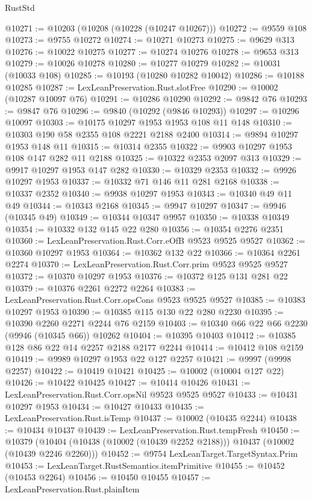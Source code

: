\begin{lexlean}{RustStd}
\begin{coremodule}
@10271 := @10203 (@10208 (@10228 (@10247 @10267)))
@10272 := @9559 @108
@10273 := @9755 @10272
@10274 := @10271 @10273
@10275 := @9629 @313
@10276 := @10022 @10275
@10277 := @10274 @10276
@10278 := @9653 @313
@10279 := @10026 @10278
@10280 := @10277 @10279
@10282 := @10031 (@10033 @108)
@10285 := @10193 (@10280 @10282 @10042)
@10286 := @10188 @10285
@10287 := LexLeanPreservation.Rust.slotFree
@10290 := @10002 (@10287 @10097 @76)
@10291 := @10286 @10290
@10292 := @9842 @76
@10293 := @9847 @76
@10296 := @9840 (@10292 (@9846 @10293))
@10297 := @10296 @10097
@10303 := @10175 @10297 @1953 @1953 @108 @11 @148
@10310 := @10303 @190 @58 @2355 @108 @2221 @2188 @2400
@10314 := @9894 @10297 @1953 @148 @11
@10315 := @10314 @2355
@10322 := @9903 @10297 @1953 @108 @147 @282 @11 @2188
@10325 := @10322 @2353 @2097 @313
@10329 := @9917 @10297 @1953 @147 @282
@10330 := @10329 @2353
@10332 := @9926 @10297 @1953
@10337 := @10332 @71 @146 @11 @281 @2168
@10338 := @10337 @2352
@10340 := @9938 @10297 @1953
@10343 := @10340 @49 @11 @49
@10344 := @10343 @2168
@10345 := @9947 @10297
@10347 := @9946 (@10345 @49)
@10349 := @10344 @10347 @9957
@10350 := @10338 @10349
@10354 := @10332 @132 @145 @22 @280
@10356 := @10354 @2276 @2351
@10360 := LexLeanPreservation.Rust.Corr.eOfB @9523 @9525 @9527
@10362 := @10360 @10297 @1953
@10364 := @10362 @132 @22
@10366 := @10364 @2261 @2274
@10370 := LexLeanPreservation.Rust.Corr.prim @9523 @9525 @9527
@10372 := @10370 @10297 @1953
@10376 := @10372 @125 @131 @281 @22
@10379 := @10376 @2261 @2272 @2264
@10383 := LexLeanPreservation.Rust.Corr.opsCons @9523 @9525 @9527
@10385 := @10383 @10297 @1953
@10390 := @10385 @115 @130 @22 @280 @2230
@10395 := @10390 @2260 @2271 @2244 @76 @2159
@10403 := @10340 @66 @22 @66 @2230 (@9946 (@10345 @66)) @10262
@10404 := @10395 @10403
@10412 := @10385 @128 @86 @22 @14 @2257 @2188 @2177 @2244
@10414 := @10412 @108 @2159
@10419 := @9989 @10297 @1953 @22 @127 @2257
@10421 := @9997 (@9998 @2257)
@10422 := @10419 @10421
@10425 := @10002 (@10004 @127 @22)
@10426 := @10422 @10425
@10427 := @10414 @10426
@10431 := LexLeanPreservation.Rust.Corr.opsNil @9523 @9525 @9527
@10433 := @10431 @10297 @1953
@10434 := @10427 @10433
@10435 := LexLeanPreservation.Rust.isTemp
@10437 := @10002 (@10435 @2244)
@10438 := @10434 @10437
@10439 := LexLeanPreservation.Rust.tempFresh
@10450 := @10379
    (@10404 (@10438 (@10002 (@10439 @2252 @2188))) @10437 (@10002 (@10439 @2246 @2260)))
@10452 := @9754 LexLeanTarget.TargetSyntax.Prim
@10453 := LexLeanTarget.RustSemantics.itemPrimitive
@10455 := @10452 (@10453 @2264)
@10456 := @10450 @10455
@10457 := LexLeanPreservation.Rust.plainItem

\end{coremodule}
\end{lexlean}
